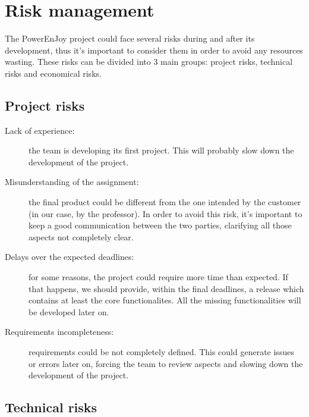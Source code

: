 \section{Risk management}

The PowerEnJoy project could face several risks during and after its development, thus it's important to consider them in order to avoid any resources wasting. These risks can be divided into 3 main groups: project risks, technical risks and economical risks.

\subsection {Project risks}

\begin{description}
	\item [Lack of experience: ] the team is developing its first project. This will probably slow down the development of the project.
	\item [Misunderstanding of the assignment: ] the final product could be different from the one intended by the customer (in our case, by the professor). In order to avoid this risk, it's important to keep a good communication between the two parties, clarifying all those aspects not completely clear.
	\item [Delays over the expected deadlines: ] for some reasons, the project could require more time than expected. If that happens, we should provide, within the final deadlines, a release which contains at least the core functionalites. All the missing functionalities will be developed later on.
	\item [Requirements incompleteness: ] requirements could be not completely defined. This could generate issues or errors later on, forcing the team to review aspects and slowing down the development of the project.
\end{description}

\subsection {Technical risks}

